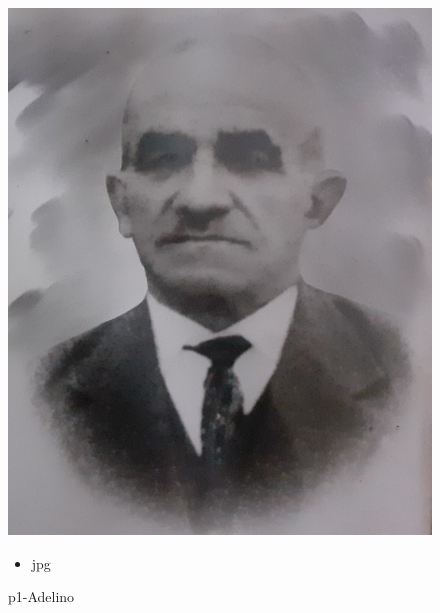 \documentclass{article}
\begin{document}
		\begin{figure}[ht!]
		\begin{minipage}{0.35\textwidth}
			\centering
			\includegraphics[width=\linewidth]{OUT/public/p1-Adelino.jpg}
			\caption{ p1-Adelino }
		\end{minipage}
		\hspace{1cm} %
		\begin{minipage}{0.3\textwidth}
			\begin{tcolorbox}[colback=white, colframe=black, boxrule=1pt]
				\begin{itemize}
					\item jpg
                    
				\end{itemize}

			\end{tcolorbox}
		\end{minipage}
	\end{figure}
	
\clearpage
\end{document}
